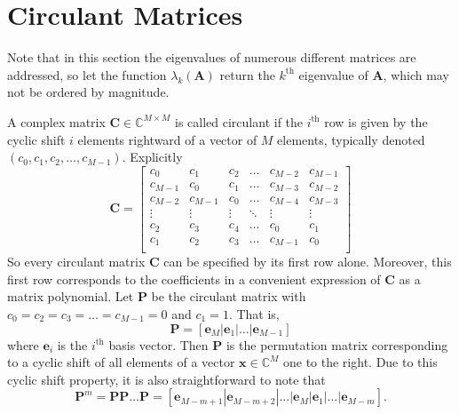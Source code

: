 \documentclass[letterpaper,12pt,oneside,final]{article}
\newcommand{\ve}[1]{\mathbf{#1}}           %
\newcommand{\m}[1]{\mathbf{#1}}               %
\newcommand{\field}[1]{\mathbb{#1}}
\newcommand{\Complex}{\field{C}}
\begin{document}
\section{Circulant Matrices} \label{c:multipleTesting:circDecom}

Note that in this section the eigenvalues of numerous different matrices are addressed, so let the function $\lambda_k(\m{A})$ return the $k^{\text{th}}$ eigenvalue of $\m{A}$, which may not be ordered by magnitude.

A complex matrix $\m{C} \in \Complex^{M \times M}$ is called circulant if the $i^{\text{th}}$ row is given by the cyclic shift $i$ elements rightward of a vector of $M$ elements, typically denoted $(c_0, c_1, c_2, \dots, c_{M-1})$. Explicitly
\begin{equation} \label{eq:explicitCirculant}
  \m{C} = \begin{bmatrix}
    c_0 & c_1 & c_2 & \dots & c_{M-2} & c_{M-1} \\
    c_{M-1} & c_0 & c_1 & \dots & c_{M-3} & c_{M-2} \\
    c_{M-2} & c_{M-1} & c_0 & \dots & c_{M-4} & c_{M-3} \\
    \vdots & \vdots & \vdots & \ddots & \vdots & \vdots \\
    c_2 & c_3 & c_4 & \dots & c_0 & c_1 \\
    c_1 & c_2 & c_3 & \dots & c_{M-1} & c_0 \\
    \end{bmatrix}
\end{equation}
So every circulant matrix $\m{C}$ can be specified by its first row alone. Moreover, this first row corresponds to the coefficients in a convenient expression of $\m{C}$ as a matrix polynomial. Let $\m{P}$ be the circulant matrix with $c_0 = c_2 = c_3 = \dots = c_{M-1} = 0$ and $c_1 = 1$. That is,
\begin{equation} \label{eq:pDef}
  \m{P} = [ \ve{e}_M | \ve{e}_1 | \dots | \ve{e}_{M-1} ]
\end{equation}
where $\ve{e}_i$ is the $i^{\text{th}}$ basis vector. Then $\m{P}$ is the permutation matrix corresponding to a cyclic shift of all elements of a vector $\ve{x} \in \Complex^M$ one to the right. Due to this cyclic shift property, it is also straightforward to note that
\begin{equation} \label{eq:powerPDef}
  \m{P}^m = \m{P} \m{P} \dots \m{P} = [ \ve{e}_{M-m+1} | \ve{e}_{M-m+2} | \dots | \ve{e}_M | \ve{e}_1 | \dots | \ve{e}_{M-m} ].
\end{equation}
\end{document}
